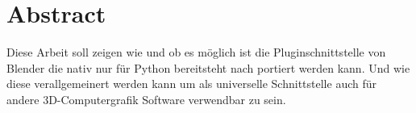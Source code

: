 \section*{Abstract}

Diese Arbeit soll zeigen wie und ob es möglich ist die Pluginschnittstelle von Blender die nativ nur für Python bereitsteht nach \CS portiert werden kann. Und wie diese verallgemeinert werden kann um als universelle Schnittstelle auch für andere 3D-Computergrafik Software verwendbar zu sein. 
